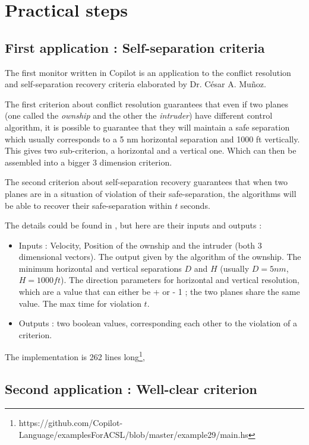 \documentclass[a4paper,11pt,final]{article}
\begin{document}
	\section{Practical steps}
	\subsection{First application : Self-separation criteria}
	
	The first monitor written in Copilot is an application to the conflict resolution and self-separation recovery criteria elaborated by Dr. César A. Muñoz. 
	
	The first criterion about conflict resolution guarantees that even if two planes (one called the \emph{ownship} and the other the \emph{intruder}) have different control algorithm, it is possible to guarantee that they will maintain a safe separation which usually corresponds to a 5 nm horizontal separation and 1000 ft vertically. This gives two sub-criterion, a horizontal and a vertical one. Which can then be assembled into a bigger 3 dimension criterion.
	
	The second criterion about self-separation recovery guarantees that when two planes are in a situation of violation of their safe-separation, the algorithms will be able to recover their safe-separation within $t$ seconds.
	
	The details could be found in \cite{MBNMH2010NASA}, but here are their inputs and outputs :
	\begin{itemize}
		\item Inputs : Velocity, Position of the ownship and the intruder (both 3 dimensional vectors). The output given by the algorithm of the ownship. The minimum horizontal and vertical separations $D$ and $H$ (usually $D = 5nm$, $H=1000ft$). The direction parameters for horizontal and vertical resolution, which are a value that can either be + or - 1 ; the two planes share the same value. The max time for violation $t$.
		\item Outputs : two boolean values, corresponding each other to the violation of a criterion.
	\end{itemize}
	
	The implementation is 262 lines long\footnote{https://github.com/Copilot-Language/examplesForACSL/blob/master/example29/main.hs}, 
	
	\subsection{Second application : Well-clear criterion}
\end{document}
